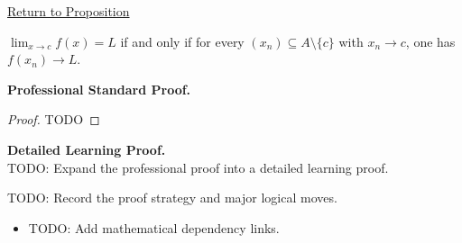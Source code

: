 \newpage
{}
\label{prf:sequential-criterion-limits}

\begin{remark*}[Return]
\hyperref[prop:sequential-criterion-limits]{Return to Proposition}
\end{remark*}

\begin{proposition*}
$\lim_{x\to c}f(x)=L$ if and only if for every $(x_n)\subseteq A\setminus\{c\}$ with $x_n\to c$, one has $f(x_n)\to L$.
\end{proposition*}

\textbf{Professional Standard Proof.}~\\
\begin{proof}
TODO
\end{proof}

\textbf{Detailed Learning Proof.}~\\
TODO: Expand the professional proof into a detailed learning proof.

\begin{remark*}
TODO: Record the proof strategy and major logical moves.
\end{remark*}

\begin{dependencies}
\begin{itemize}
  \item TODO: Add mathematical dependency links.
\end{itemize}
\end{dependencies}
